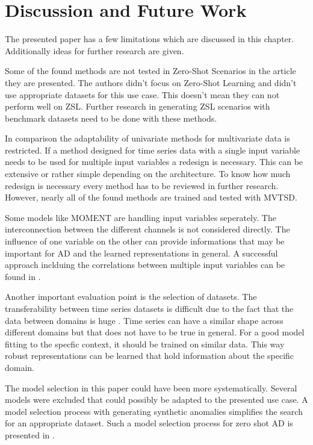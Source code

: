 \section{Discussion and Future Work}\label{discussion}
The presented paper has a few limitations which are discussed in this chapter. Additionally ideas for further research are given.

Some of the found methods are not tested in Zero-Shot Scenarios in the article they are presented. The authors didn't focus on Zero-Shot Learning and didn't use appropriate datasets for this use case.  This doesn't mean they can not perform well on ZSL. Further research in generating ZSL scenarios with benchmark datasets need to be done with these methods.

In comparison the adaptability of univariate methods for multivariate data is restricted. If a method designed for time series data with a single input variable needs to be used for multiple input variables a redesign is necessary. This can be extensive or rather simple depending on the architecture. To know how much redesign is necessary every method has to be reviewed in further research. However, nearly all of the found methods are trained and tested with MVTSD.

Some models like MOMENT are handling input variables seperately. The interconnection between the different channels is not considered directly. The influence of one variable on the other can provide informations that may be important for AD and the learned representations in general. A successful approach inclduing the correlations between multiple input variables can be found in \cite{pranavan_contrastive_2022}.

Another important evaluation point is the selection of datasets. The transferability between time series datasets is difficult due to the fact that the data between domains is huge \cite{ma_survey_2023}. Time series can have a similar shape across different domains but that does not have to be true in general. For a good model fitting to the specfic context, it should be trained on similar data. This way robust representations can be learned that hold information about the specific domain.


The model selection in this paper could have been more systematically. Several models were excluded that could possibly be adapted to the presented use case. A model selection process with generating synthetic anomalies simplifies the search for an appropriate dataset. Such a model selection process for zero shot AD is presented in \cite{fung_model_2024}.

